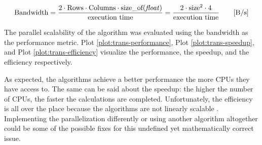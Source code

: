 \begin{equation}
    \label{eq:bandwidth}
    \textnormal{Bandwidth}=
        \frac{%
            2 \cdot \textnormal{Rows} \cdot \textnormal{Columns} \cdot %
            \textnormal{size\_of(\textit{float})}
            }
            {\textnormal{execution time}}=\frac{2\cdot \textnormal{size}^2\cdot 4}
                                               {\textnormal{execution time}}
        \qquad \textnormal{[B/s]}
\end{equation}




The parallel scalability of the algorithm was evaluated using the bandwidth as %
the performance metric. Plot \ref{plot:trans-performance}, Plot \ref{plot:trans-speedup}, %
and Plot \ref{plot:trans-efficiency} visualize the performance, the speedup, and %
the efficiency respectively. 





As expected, the algorithms achieve a better performance the more CPUs they have %
access to. The same can be said about the speedup: the higher the number of %
CPUs, the faster the calculations are completed. Unfortunately, the efficiency is %
all over the place because the algorithms are not linearly scalable \cite{scalability}. %
Implementing the parallelization differently or using another algorithm altogether %
could be some of the possible fixes for this undefined yet mathematically correct %
issue.